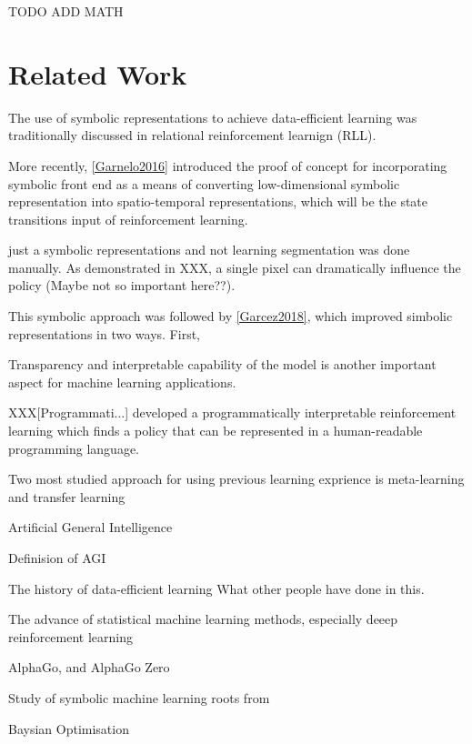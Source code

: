 \documentclass[12pt,twoside]{report}
\begin{document}
TODO ADD MATH

\chapter{Related Work}
\label{related_work}

The use of symbolic representations to achieve data-efficient learning was traditionally discussed in relational reinforcement learnign (RLL).

More recently, \ref{Garnelo2016} introduced the proof of concept for incorporating symbolic front end as a means of converting low-dimensional symbolic representation into spatio-temporal representations, which will be the state transitions input of reinforcement learning.

just a symbolic representations and not learning
segmentation was done manually.
As demonstrated in XXX, a single pixel can dramatically influence the policy (Maybe not so important here??).


This symbolic approach was followed by \ref{Garcez2018}, which improved simbolic representations in two ways. First,



Transparency and interpretable capability of the model is another important aspect for machine learning applications.

XXX[Programmati...] developed a programmatically interpretable reinforcement learning which finds a policy that can be represented in a human-readable programming language.

Two most studied approach for using previous learning exprience is meta-learning and transfer learning

Artificial General Intelligence

Definision of AGI

The history of data-efficient learning
What other people have done in this.

The advance of statistical machine learning methods, especially deeep reinforcement learning

AlphaGo, and AlphaGo Zero

Study of symbolic machine learning roots from

Baysian Optimisation
\end{document}
